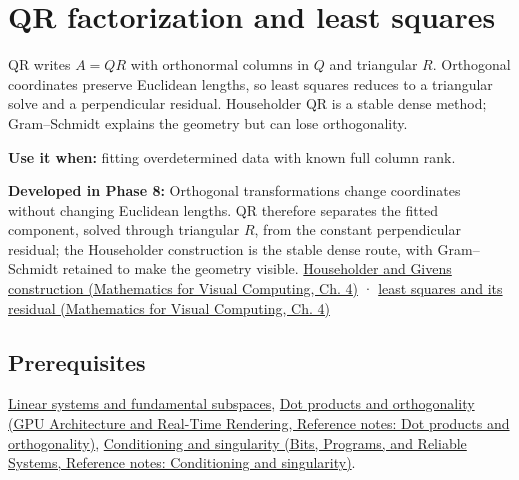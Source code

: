 \hypertarget{appendix-c3421e6b4f2c}{}\label{referencestart:appendix-c3421e6b4f2c}
\section{QR factorization and least squares}\label{appendix-c3421e6b4f2c-qr-factorization-and-least-squares}

\hypertarget{appendix-c3421e6b4f2c-qr-factorization-and-least-squares}{}

QR writes \(A=QR\) with orthonormal columns in \(Q\) and triangular \(R\). Orthogonal coordinates preserve Euclidean lengths, so least squares reduces to a triangular solve and a perpendicular residual. Householder QR is a stable dense method; Gram--Schmidt explains the geometry but can lose orthogonality.

\textbf{Use it when:} fitting overdetermined data with known full column rank.

\textbf{Developed in Phase 8:} Orthogonal transformations change coordinates without changing Euclidean lengths. QR therefore separates the fitted component, solved through triangular \(R\), from the constant perpendicular residual; the Householder construction is the stable dense route, with Gram--Schmidt retained to make the geometry visible. \href{../02-Mathematics-for-Visual-Computing/main.pdf\#nameddest=01-foundations-i-ch020-reflections-and-plane-rotations-build-qr-without-losing-lengths}{Householder and Givens construction (Mathematics for Visual Computing, Ch. 4)} · \href{../02-Mathematics-for-Visual-Computing/main.pdf\#nameddest=01-foundations-i-ch020-qr-turns-least-squares-into-a-triangular-solve-plus-an-irreducible-residual}{least squares and its residual (Mathematics for Visual Computing, Ch. 4)}

\subsection{Prerequisites}\label{appendix-c3421e6b4f2c-prerequisites}

\hypertarget{appendix-c3421e6b4f2c-prerequisites}{}

\hyperref[appendix-8572a4a060c1]{Linear systems and fundamental subspaces}, \href{../06-GPU-Architecture-and-Real-Time-Rendering/main.pdf\#nameddest=appendix-8bc4e8fc547c}{Dot products and orthogonality (GPU Architecture and Real-Time Rendering, Reference notes: Dot products and orthogonality)}, \href{../01-Bits-Programs-and-Reliable-Systems/main.pdf\#nameddest=appendix-8f6a01f284a7}{Conditioning and singularity (Bits, Programs, and Reliable Systems, Reference notes: Conditioning and singularity)}.

